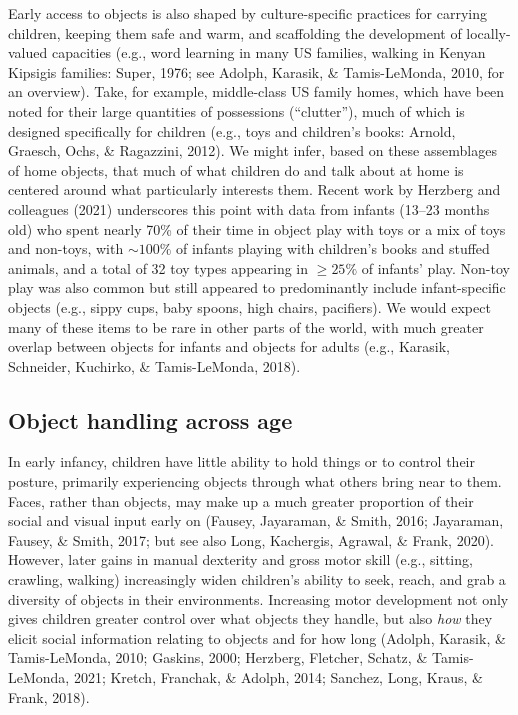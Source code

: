\documentclass[10pt, letterpaper]{article}
\begin{document}
Early access to objects is also shaped by culture-specific practices for
carrying children, keeping them safe and warm, and scaffolding the
development of locally-valued capacities (e.g., word learning in many US
families, walking in Kenyan Kipsigis families: Super, 1976; see Adolph,
Karasik, \& Tamis-LeMonda, 2010, for an overview). Take, for example,
middle-class US family homes, which have been noted for their large
quantities of possessions (``clutter''), much of which is designed
specifically for children (e.g., toys and children's books: Arnold,
Graesch, Ochs, \& Ragazzini, 2012). We might infer, based on these
assemblages of home objects, that much of what children do and talk
about at home is centered around what particularly interests them.
Recent work by Herzberg and colleagues (2021) underscores this point
with data from infants (13--23 months old) who spent nearly 70\% of
their time in object play with toys or a mix of toys and non-toys, with
\({\sim}100\%\) of infants playing with children's books and stuffed
animals, and a total of 32 toy types appearing in \({\ge}25\%\) of
infants' play. Non-toy play was also common but still appeared to
predominantly include infant-specific objects (e.g., sippy cups, baby
spoons, high chairs, pacifiers). We would expect many of these items to
be rare in other parts of the world, with much greater overlap between
objects for infants and objects for adults (e.g., Karasik, Schneider,
Kuchirko, \& Tamis-LeMonda, 2018).

\hypertarget{object-handling-across-age}{%
\subsection{Object handling across
age}\label{object-handling-across-age}}

In early infancy, children have little ability to hold things or to
control their posture, primarily experiencing objects through what
others bring near to them. Faces, rather than objects, may make up a
much greater proportion of their social and visual input early on
(Fausey, Jayaraman, \& Smith, 2016; Jayaraman, Fausey, \& Smith, 2017;
but see also Long, Kachergis, Agrawal, \& Frank, 2020). However, later
gains in manual dexterity and gross motor skill (e.g., sitting,
crawling, walking) increasingly widen children's ability to seek, reach,
and grab a diversity of objects in their environments. Increasing motor
development not only gives children greater control over what objects
they handle, but also \emph{how} they elicit social information relating
to objects and for how long (Adolph, Karasik, \& Tamis-LeMonda, 2010;
Gaskins, 2000; Herzberg, Fletcher, Schatz, \& Tamis-LeMonda, 2021;
Kretch, Franchak, \& Adolph, 2014; Sanchez, Long, Kraus, \& Frank,
2018).
\end{document}
